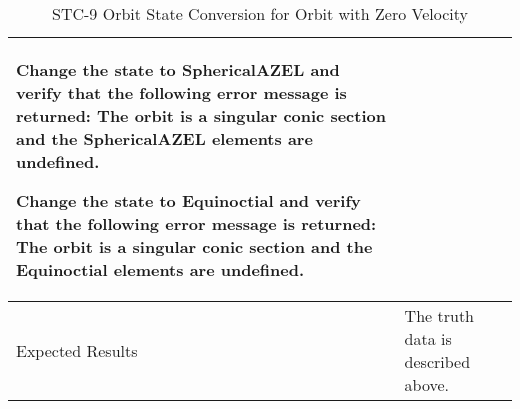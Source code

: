 \begin{table}[htbp!]
\begin{tabular}{|p{1.05 in} |p{4.75 in} |}
\begin{compactenum}
             \item Change the state to SphericalAZEL and verify that the following error message is returned: The orbit is a singular conic section and the SphericalAZEL elements are undefined.
             \item Change the state to Equinoctial and verify that the following error message is returned:
                   The orbit is a singular conic section and the Equinoctial elements are undefined.
         \end{compactenum}
         \\ \hline
         Expected Results & The truth data is described above.\\
      \hline
      \end{tabular}
      \label{Table:STC-9}
      \caption{STC-9  Orbit State Conversion for Orbit with Zero Velocity}
\end{table} 